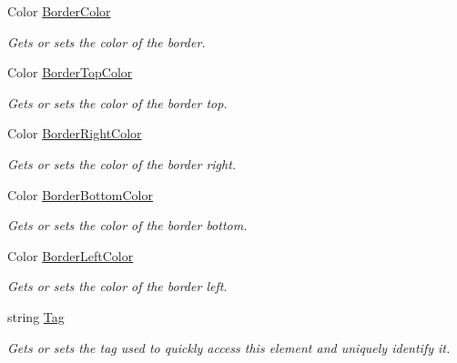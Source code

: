 \begin{DoxyCompactItemize}
Color \hyperlink{class_midnight_blue_1_1_engine_1_1_u_i_1_1_u_i_element_a9a743302f1b3978328c85ecae3f6adcb}{Border\+Color}
\begin{DoxyCompactList}\small\item\em Gets or sets the color of the border. \end{DoxyCompactList}\item 
Color \hyperlink{class_midnight_blue_1_1_engine_1_1_u_i_1_1_u_i_element_a6eb674d26e9970557dc5d55f41ad3010}{Border\+Top\+Color}
\begin{DoxyCompactList}\small\item\em Gets or sets the color of the border top. \end{DoxyCompactList}\item 
Color \hyperlink{class_midnight_blue_1_1_engine_1_1_u_i_1_1_u_i_element_a49304800447f5a482ec55bd338187791}{Border\+Right\+Color}
\begin{DoxyCompactList}\small\item\em Gets or sets the color of the border right. \end{DoxyCompactList}\item 
Color \hyperlink{class_midnight_blue_1_1_engine_1_1_u_i_1_1_u_i_element_a0714670ed29238fcbb24b9d4beaae2e3}{Border\+Bottom\+Color}
\begin{DoxyCompactList}\small\item\em Gets or sets the color of the border bottom. \end{DoxyCompactList}\item 
Color \hyperlink{class_midnight_blue_1_1_engine_1_1_u_i_1_1_u_i_element_a5bc05ca69b1d8678de07a8fa6c903c7a}{Border\+Left\+Color}
\begin{DoxyCompactList}\small\item\em Gets or sets the color of the border left. \end{DoxyCompactList}\item 
string \hyperlink{class_midnight_blue_1_1_engine_1_1_u_i_1_1_u_i_element_adddf1a9824fdd14771685ac3c188bb6b}{Tag}
\begin{DoxyCompactList}\small\item\em Gets or sets the tag used to quickly access this element and uniquely identify it. \end{DoxyCompactList}\end{DoxyCompactItemize}


